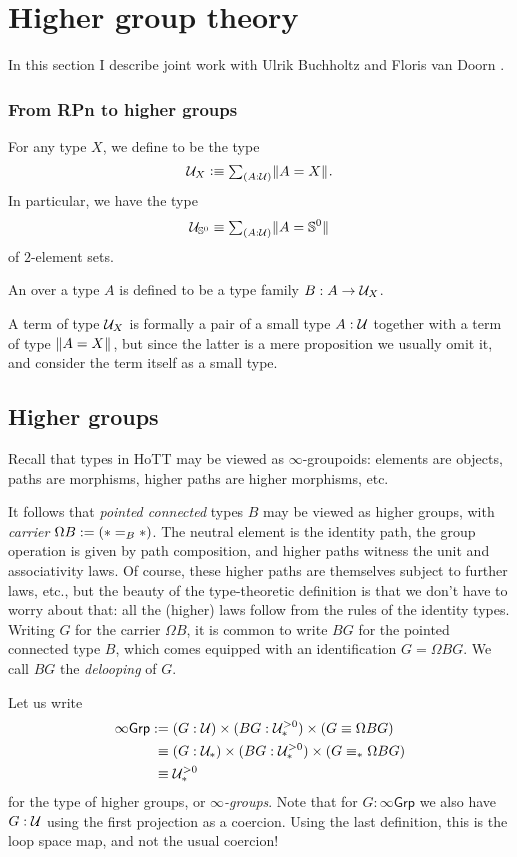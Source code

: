 \chapter{Higher group theory}
In this section I describe joint work with Ulrik Buchholtz and Floris van Doorn \cite{BuchholtzDoornRijke}.

\subsection{From RPn to higher groups}
\begin{defn}
For any type $X$, we define  to be the type \[\UU_X\defeq\sm{A:\UU}\brck{A=X}.\] In particular, we have the type \[\UU_{\sphere{0}}\jdeq\sm{A:\UU}\brck{A={\sphere{0}}}\] of $2$\nobreakdash-element sets.

An  over a type $A$ is defined to be a type family $B:A\to\mathcal{U}_X$. 
\end{defn}

A term of type $\mathcal{U}_X$ is formally a pair of a small type $A:\mathcal{U}$ together with a term of type $\Vert A=X\Vert_{}$, but since the latter is a mere proposition we usually omit it, and consider the term itself as a small type.

\section{Higher groups}
\label{sec:higher-groups}

Recall that types in HoTT may be viewed as $\infty$-groupoids:
elements are objects, paths are morphisms, higher paths are higher
morphisms, etc.

It follows that \emph{pointed connected} types $B$ may be viewed as higher
groups, with \emph{carrier} $\Omega B := (\ast =_B \ast)$.
The neutral element is the identity path,
the group operation is given by path composition,
and higher paths witness the unit and associativity laws.
Of course, these higher paths are themselves subject to further laws,
etc., but the beauty of the type-theoretic definition is
that we don't have to worry about that:
all the (higher) laws follow from the rules of the identity types.
Writing $G$ for the carrier $\Omega B$, it is common to write $BG$ for the pointed
connected type $B$, which comes equipped with an identification $G = \Omega BG$.
We call $BG$ the \emph{delooping} of $G$.

Let us write
\begin{align*}
  \infty\mathsf{Grp}
  &:= (G : \mathcal{U}) \times (BG : \mathcal{U}_\ast^{>0}) \times (G \equiv \Omega BG) \\
  &\phantom{:}\equiv (G : \mathcal{U}_\ast) \times (BG : \mathcal{U}_\ast^{>0}) \times (G \equiv_\ast \Omega BG) \\
  &\phantom{:}\equiv \mathcal{U}_\ast^{>0}
\end{align*}
for the type of higher groups, or \emph{$\infty$-groups}.
Note that for $G:\infty\mathsf{Grp}$
we also have $G:\mathcal{U}$ using the first projection as a coercion. Using
the last definition, this is the loop space map, and not the usual coercion!

